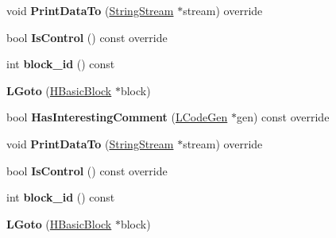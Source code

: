 \begin{DoxyCompactItemize}
\item 
void {\bfseries Print\+Data\+To} (\hyperlink{classv8_1_1internal_1_1_string_stream}{String\+Stream} $\ast$stream) override\hypertarget{classv8_1_1internal_1_1_l_goto_a42fa9224cfb4df48322ebdcf082ab6db}{}\label{classv8_1_1internal_1_1_l_goto_a42fa9224cfb4df48322ebdcf082ab6db}

\item 
bool {\bfseries Is\+Control} () const  override\hypertarget{classv8_1_1internal_1_1_l_goto_a4d45f583f9f81949e0ec9ab82d0a4dd1}{}\label{classv8_1_1internal_1_1_l_goto_a4d45f583f9f81949e0ec9ab82d0a4dd1}

\item 
int {\bfseries block\+\_\+id} () const \hypertarget{classv8_1_1internal_1_1_l_goto_a232c7b24fbe5cb48aa50908fe3d26626}{}\label{classv8_1_1internal_1_1_l_goto_a232c7b24fbe5cb48aa50908fe3d26626}

\item 
{\bfseries L\+Goto} (\hyperlink{classv8_1_1internal_1_1_h_basic_block}{H\+Basic\+Block} $\ast$block)\hypertarget{classv8_1_1internal_1_1_l_goto_a508956b700f4a115d2ae81e5c81b6d52}{}\label{classv8_1_1internal_1_1_l_goto_a508956b700f4a115d2ae81e5c81b6d52}

\item 
bool {\bfseries Has\+Interesting\+Comment} (\hyperlink{classv8_1_1internal_1_1_l_code_gen}{L\+Code\+Gen} $\ast$gen) const  override\hypertarget{classv8_1_1internal_1_1_l_goto_ae2dcadae50f2f182e7f9d772a170fe7b}{}\label{classv8_1_1internal_1_1_l_goto_ae2dcadae50f2f182e7f9d772a170fe7b}

\item 
void {\bfseries Print\+Data\+To} (\hyperlink{classv8_1_1internal_1_1_string_stream}{String\+Stream} $\ast$stream) override\hypertarget{classv8_1_1internal_1_1_l_goto_a42fa9224cfb4df48322ebdcf082ab6db}{}\label{classv8_1_1internal_1_1_l_goto_a42fa9224cfb4df48322ebdcf082ab6db}

\item 
bool {\bfseries Is\+Control} () const  override\hypertarget{classv8_1_1internal_1_1_l_goto_a4d45f583f9f81949e0ec9ab82d0a4dd1}{}\label{classv8_1_1internal_1_1_l_goto_a4d45f583f9f81949e0ec9ab82d0a4dd1}

\item 
int {\bfseries block\+\_\+id} () const \hypertarget{classv8_1_1internal_1_1_l_goto_a232c7b24fbe5cb48aa50908fe3d26626}{}\label{classv8_1_1internal_1_1_l_goto_a232c7b24fbe5cb48aa50908fe3d26626}

\item 
{\bfseries L\+Goto} (\hyperlink{classv8_1_1internal_1_1_h_basic_block}{H\+Basic\+Block} $\ast$block)\hypertarget{classv8_1_1internal_1_1_l_goto_a508956b700f4a115d2ae81e5c81b6d52}{}\label{classv8_1_1internal_1_1_l_goto_a508956b700f4a115d2ae81e5c81b6d52}


\end{DoxyCompactItemize}
